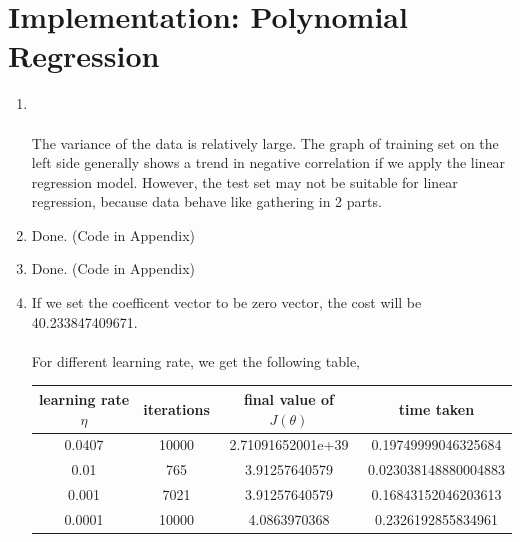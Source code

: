 \documentclass[11pt]{article}
\begin{document}
\section{Implementation: Polynomial Regression}
\begin{enumerate}[label=(\alph*)]
\item
    \\\\
    The variance of the data is relatively large. The graph of training set on the left side generally shows a trend in negative correlation if we apply the linear regression model. However, the test set may not be suitable for linear regression, because data behave like gathering in 2 parts.

\item 
    Done. (Code in Appendix)

\item 
    Done. (Code in Appendix)

\item 
    If we set the coefficent vector to be zero vector, the cost will be 40.233847409671.\\\\
    For different learning rate, we get the following table,\\
    \begin{center}
        \begin{tabular}{||c c c c||} 
        \hline
        learning rate $\eta$ & iterations & final value of $J(\theta)$ & time taken\\ [0.5ex] 
        \hline\hline
        0.0407 & 10000 & 2.71091652001e+39 & 0.19749999046325684 \\ 
        \hline
        0.01 & 765 & 3.91257640579 & 0.023038148880004883\\
        \hline
        0.001 & 7021 & 3.91257640579 & 0.16843152046203613\\
        \hline
        0.0001 & 10000 & 4.0863970368 & 0.2326192855834961\\ [1ex]
        \hline
       \end{tabular}
    \end{center}


\end{enumerate}
\end{document}

